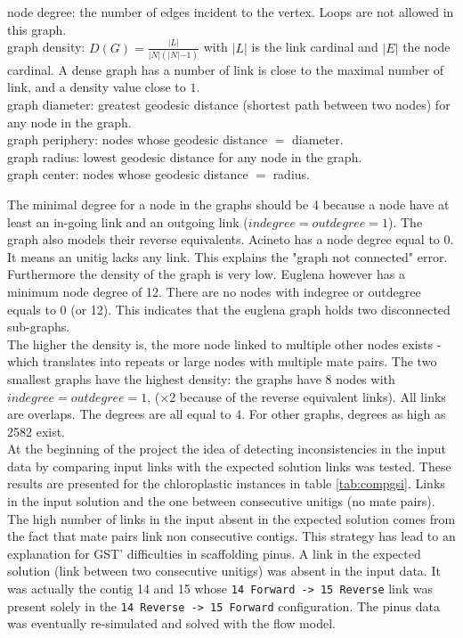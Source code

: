 \documentclass[12pt]{article}
\begin{document}
\begin{table}[h!]
{\color{magenta} node degree}: the number of edges incident to the vertex. Loops are not allowed in this graph.\\
{\color{magenta} graph density}: $D(G)=\frac{\lvert L \lvert}{\lvert N \lvert(\lvert N \lvert-1)}$ with $\lvert L \lvert$ is the link cardinal and $\lvert E \lvert$ the node cardinal. A dense graph has a  number of link is close to the maximal number of link, and a density value close to $1$. \\
{\color{magenta} graph diameter}: greatest geodesic distance (shortest path between two nodes) for any node in the graph. \\
{\color{magenta} graph periphery}: nodes whose geodesic distance $=$ diameter.\\
{\color{magenta} graph radius}: lowest geodesic distance for any node in the graph.\\
{\color{magenta} graph center}: nodes whose geodesic distance $=$ radius.\\
\label{tab:graphcomplexity}
\end{table}

The minimal degree for a node in the graphs should be 4 because a node have at least an in-going link and an outgoing link ($indegree=outdegree=1$). The graph also models their reverse equivalents. Acineto has a node degree equal to 0. It means an unitig lacks any link. This explains the "graph not connected" error. Furthermore the density of the graph is very low. Euglena however has a minimum node degree of 12. There are no nodes with indegree or outdegree equals to 0 (or 12). This indicates that the euglena graph holds two disconnected sub-graphs. \\
The higher the density is, the more node linked to multiple other nodes exists - which translates into repeats or large nodes with multiple mate pairs.  The two smallest graphs have the highest density: the graphs have 8 nodes with $indegree=outdegree=1$, ($\times 2$ because of the reverse equivalent links). All links are overlaps. The degrees are all equal to 4. For other graphs, degrees as high as 2582 exist.\\

At the beginning of the project the idea of detecting inconsistencies in the input data by comparing input links with the expected solution links was tested. These results are presented for the chloroplastic instances in table \ref{tab:compgsi}. Links in the input solution and the one between consecutive unitigs (no mate pairs). The high number of links in the input absent in the expected solution comes from the fact that mate pairs link non consecutive contigs. This strategy has  lead to an explanation for GST' difficulties in scaffolding pinus. A link in the expected solution (link between two consecutive unitigs) was absent in the input data. It was actually the contig 14 and 15 whose \texttt{14 Forward -> 15 Reverse} link was present solely in the  \texttt{14 Reverse -> 15 Forward} configuration. The pinus data was eventually re-simulated and solved with the flow model. 
\end{document}
